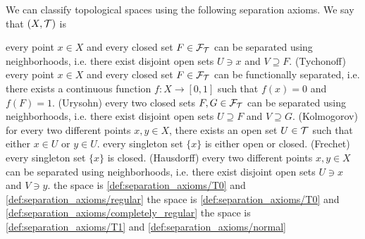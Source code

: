 \begin{definition}\label{def:separation_axioms}
  We can classify topological spaces using the following separation axioms. We say that $(X, \mathcal T)$ is

  \begin{description}
     every point $x \in X$ and every closed set $F \in \mathcal F_{\mathcal T}$ can be separated using neighborhoods, i.e. there exist disjoint open sets $U \ni x$ and $V \supseteq F$.
     (Tychonoff) every point $x \in X$ and every closed set $F \in \mathcal F_{\mathcal T}$ can be functionally separated, i.e. there exists a continuous function $f: X \to [0, 1]$ such that $f(x) = 0$ and $f(F) = 1$.
     (Urysohn) every two closed sets $F, G \in \mathcal F_{\mathcal T}$ can be separated using neighborhoods, i.e. there exist disjoint open sets $U \supseteq F$ and $V \supseteq G$.
     (Kolmogorov) for every two different points $x, y \in X$, there exists an open set $U \in \mathcal T$ such that either $x \in U$ or $y \in U$.
     every singleton set $\{ x \}$ is either open or closed.
     (Frechet) every singleton set $\{ x \}$ is closed.
     (Hausdorff) every two different points $x, y \in X$ can be separated using neighborhoods, i.e. there exist disjoint open sets $U \ni x$ and $V \ni y$.
     the space is \ref{def:separation_axioms/T0} and \ref{def:separation_axioms/regular}
     the space is \ref{def:separation_axioms/T0} and \ref{def:separation_axioms/completely_regular}
     the space is \ref{def:separation_axioms/T1} and \ref{def:separation_axioms/normal}
  \end{description}
\end{definition}
